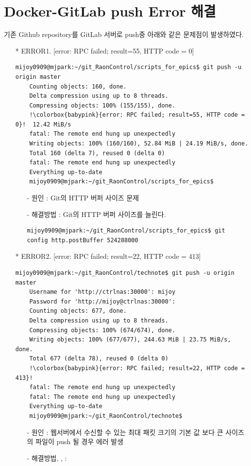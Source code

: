 \documentclass[11pt
  , a4paper
  , article
  , oneside
]{memoir}
\begin{document}
\chapter{Docker-GitLab push Error 해결}
기존 Github repository를 GitLab 서버로 push중 아래와 같은 문제점이 발생하였다.
\begin{itemize}
\item[*]ERROR1. [error: RPC failed; result=55, HTTP code = 0]	
{\scriptsize
\begin{lstlisting}[style=termstyle, escapechar=!]
	mijoy0909@mjpark:~/git_RaonControl/scripts_for_epics$ git push -u origin master 
	Counting objects: 160, done.
	Delta compression using up to 8 threads.
	Compressing objects: 100% (155/155), done.
	!\colorbox{babypink}{error: RPC failed; result=55, HTTP code = 0}!  12.42 MiB/s   
	fatal: The remote end hung up unexpectedly
	Writing objects: 100% (160/160), 52.84 MiB | 24.19 MiB/s, done.
	Total 160 (delta 7), reused 0 (delta 0)
	fatal: The remote end hung up unexpectedly
	Everything up-to-date
	mijoy0909@mjpark:~/git_RaonControl/scripts_for_epics$ 
\end{lstlisting}
}
\begin{itemize}
\item[-] 원인 : Git의 HTTP 버퍼 사이즈 문제
\item[-] 해결방법 : Git의 HTTP 버퍼 사이즈를 늘린다.
{\scriptsize
\begin{lstlisting}[style=termstyle, escapechar=!]
	mijoy0909@mjpark:~/git_RaonControl/scripts_for_epics$ git config http.postBuffer 524288000
\end{lstlisting}
}
\end{itemize}

\item[*]ERROR2. [error: RPC failed; result=22, HTTP code = 413]	
{\scriptsize
\begin{lstlisting}[style=termstyle, escapechar=!]
	mijoy0909@mjpark:~/git_RaonControl/technote$ git push -u origin master 
	Username for 'http://ctrlnas:30000': mijoy
	Password for 'http://mijoy@ctrlnas:30000': 
	Counting objects: 677, done.
	Delta compression using up to 8 threads.
	Compressing objects: 100% (674/674), done.
	Writing objects: 100% (677/677), 244.63 MiB | 23.75 MiB/s, done.
	Total 677 (delta 78), reused 0 (delta 0)
	!\colorbox{babypink}{error: RPC failed; result=22, HTTP code = 413}!
	fatal: The remote end hung up unexpectedly
	fatal: The remote end hung up unexpectedly
	Everything up-to-date
	mijoy0909@mjpark:~/git_RaonControl/technote$ 
\end{lstlisting}
}
	\begin{itemize}
	\item[-] 원인 : 웹서버에서 수신할 수 있는 최대 패킷 크기의 기본 값 보다 큰 사이즈의 파일이 push 될 경우 에러 발생 
	\item[-] 해결방법\citep{413error1}, \citep{413error2}, \citep{dockergitlab} : 
	

\end{itemize}
\end{itemize}
\end{document}
